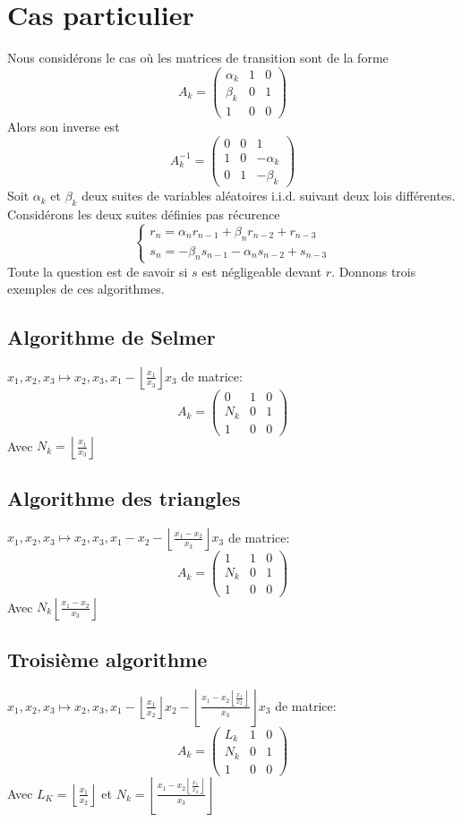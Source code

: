 \documentclass[12pt]{article}
\theoremstyle{plain}%
\theoremstyle{definition}
\theoremstyle{remark}
\begin{document}
\section{Cas particulier}
Nous considérons le cas où les matrices de transition sont de la forme $$
A_k=\begin{pmatrix}
\alpha_k & 1 & 0 \\
\beta_k & 0 & 1 \\
1 & 0 & 0
\end{pmatrix}
$$
Alors son inverse est $$
A_k^{-1}=\begin{pmatrix}
0 & 0 & 1 \\
1 & 0 & - \alpha_k \\
0 & 1 & - \beta_k
\end{pmatrix}
$$
Soit $\alpha_k$ et $\beta_k$ deux suites de variables aléatoires i.i.d. suivant deux lois différentes. Considérons les deux suites définies pas récurence $$
\left \{
\begin{array}{l}
r_{n}=\alpha_n r_{n-1} + \beta_n r_{n-2} + r_{n-3}\\
s_{n}= - \beta_n s_{n-1} - \alpha_n s_{n-2} + s_{n-3}
\end{array}
\right .
$$
Toute la question est de savoir si $s$ est négligeable devant $r$.\newline
Donnons trois exemples de ces algorithmes.
\subsection{Algorithme de Selmer}
$x_1,x_2,x_3 \mapsto x_2,x_3,x_1- \left \lfloor \frac{x_1}{x_3} \right \rfloor x_3 $ de matrice: $$
A_k=\begin{pmatrix}
0 & 1 & 0 \\
N_k & 0 & 1 \\
1 & 0 & 0
\end{pmatrix}
$$
Avec $N_k=\left \lfloor \frac{x_1}{x_3} \right \rfloor$
\subsection{Algorithme des triangles}
$x_1,x_2,x_3 \mapsto x_2,x_3,x_1- x_2 - \left \lfloor \frac{x_1-x_2}{x_3} \right \rfloor x_3 $ de matrice: $$
A_k=\begin{pmatrix}
1 & 1 & 0 \\
N_k & 0 & 1 \\
1 & 0 & 0
\end{pmatrix}
$$
Avec $N_k\left \lfloor \frac{x_1-x_2}{x_3} \right \rfloor$
\subsection{Troisième algorithme}
$x_1,x_2,x_3 \mapsto x_2,x_3,x_1- \left \lfloor \frac{x_1}{x_2} \right \rfloor x_2 - \left \lfloor \frac{x_1-x_2 \left \lfloor \frac{x_1}{x_2} \right \rfloor}{x_3} \right \rfloor x_3 $ de matrice: $$
A_k=\begin{pmatrix}
L_k & 1 & 0 \\
N_k & 0 & 1 \\
1 & 0 & 0
\end{pmatrix}
$$
Avec $L_K=\left \lfloor \frac{x_1}{x_2} \right \rfloor$ et $N_k=\left \lfloor \frac{x_1-x_2 \left \lfloor \frac{x_1}{x_2} \right \rfloor}{x_3} \right \rfloor$
\end{document}
